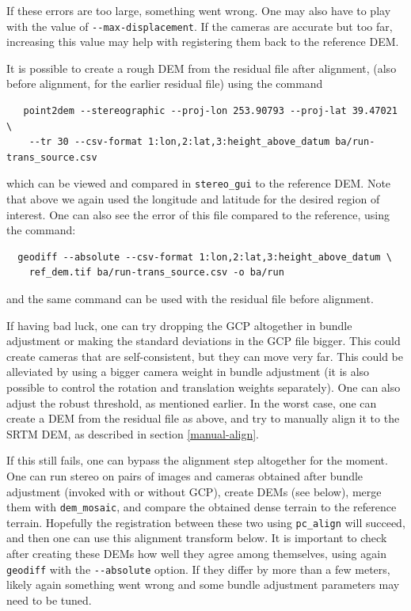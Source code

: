 If these errors are too large, something went wrong. One may also have to play
with the value of \texttt{-\/-max-displacement}. If the cameras are accurate
but too far, increasing this value may help with registering them back to the reference DEM.

It is possible to create a rough DEM from the residual file after alignment, 
(also before alignment, for the earlier residual file) using the command

\begin{verbatim}
   point2dem --stereographic --proj-lon 253.90793 --proj-lat 39.47021            \
    --tr 30 --csv-format 1:lon,2:lat,3:height_above_datum ba/run-trans_source.csv
\end{verbatim}

which can be viewed and compared in \texttt{stereo\_gui} to the reference DEM. 
Note that above we again used the longitude and latitude for the desired region 
of interest. One can also see the error of this file compared to the reference, using
the command:

\begin{verbatim}
  geodiff --absolute --csv-format 1:lon,2:lat,3:height_above_datum \
    ref_dem.tif ba/run-trans_source.csv -o ba/run
\end{verbatim}

and the same command can be used with the residual file before alignment.

If having bad luck, one can try dropping the GCP altogether in bundle
adjustment or making the standard deviations in the GCP file
bigger. This could create cameras that are self-consistent, but they can
move very far. This could be alleviated by using a bigger camera weight
in bundle adjustment (it is also possible to control the rotation and
translation weights separately). One can also adjust the robust
threshold, as mentioned earlier.  In the worst case, one can create a
DEM from the residual file as above, and try to manually align it to the
SRTM DEM, as described in section \ref{manual-align}.

If this still fails, one can bypass the alignment step altogether for
the moment. One can run stereo on pairs of images and cameras obtained
after bundle adjustment (invoked with or without GCP), create DEMs (see
below), merge them with \texttt{dem\_mosaic}, and compare the obtained
dense terrain to the reference terrain. Hopefully the registration
between these two using \texttt{pc\_align} will succeed, and then one
can use this alignment transform below. It is important to check after
creating these DEMs how well they agree among themselves, using again
\texttt{geodiff} with the \texttt{-\/-absolute} option. If they differ
by more than a few meters, likely again something went wrong and some
bundle adjustment parameters may need to be tuned. 

